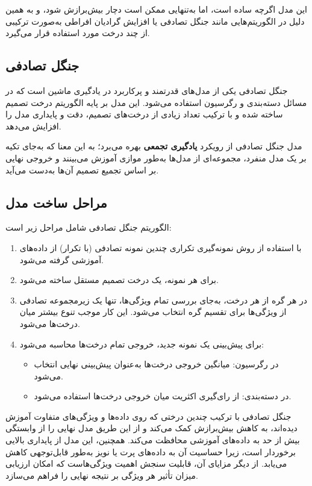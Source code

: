 این مدل اگرچه ساده است، اما به‌تنهایی ممکن است دچار بیش‌برازش شود، و به همین دلیل در الگوریتم‌هایی مانند جنگل تصادفی یا افزایش گرادیان افراطی به‌صورت ترکیبی از چند درخت مورد استفاده قرار می‌گیرد.



\subsection[جنگل تصادفی]{جنگل تصادفی}

جنگل تصادفی یکی از مدل‌های قدرتمند و پرکاربرد در یادگیری ماشین است که در مسائل دسته‌بندی و رگرسیون استفاده می‌شود. این مدل بر پایه الگوریتم درخت تصمیم ساخته شده و با ترکیب تعداد زیادی از درخت‌های تصمیم، دقت و پایداری مدل را افزایش می‌دهد.

مدل جنگل تصادفی از رویکرد \textbf{یادگیری تجمعی} بهره می‌برد؛ به این معنا که به‌جای تکیه بر یک مدل منفرد، مجموعه‌ای از مدل‌ها به‌طور موازی آموزش می‌بینند و خروجی نهایی بر اساس تجمیع تصمیم آن‌ها به‌دست می‌آید.

\subsection*{مراحل ساخت مدل}

الگوریتم جنگل تصادفی شامل مراحل زیر است:

\begin{enumerate}
	\item با استفاده از روش نمونه‌گیری تکراری چندین نمونه تصادفی (با تکرار) از داده‌های آموزشی گرفته می‌شود.
	\item برای هر نمونه، یک درخت تصمیم مستقل ساخته می‌شود.
	\item در هر گره از هر درخت، به‌جای بررسی تمام ویژگی‌ها، تنها یک زیرمجموعه تصادفی از ویژگی‌ها برای تقسیم گره انتخاب می‌شود. این کار موجب تنوع بیشتر میان درخت‌ها می‌شود.
	\item برای پیش‌بینی یک نمونه جدید، خروجی تمام درخت‌ها محاسبه می‌شود:
	\begin{itemize}
		\item در رگرسیون: میانگین خروجی درخت‌ها به‌عنوان پیش‌بینی نهایی انتخاب می‌شود.
		\item در دسته‌بندی: از رای‌گیری اکثریت میان خروجی درخت‌ها استفاده می‌شود.
	\end{itemize}
\end{enumerate}

جنگل تصادفی با ترکیب چندین درختی که روی داده‌ها و ویژگی‌های متفاوت آموزش دیده‌اند، به کاهش بیش‌برازش کمک می‌کند و از این طریق مدل نهایی را از وابستگی بیش از حد به داده‌های آموزشی محافظت می‌کند. همچنین، این مدل از پایداری بالایی برخوردار است، زیرا حساسیت آن به داده‌های پرت یا نویز به‌طور قابل‌توجهی کاهش می‌یابد. از دیگر مزایای آن، قابلیت سنجش اهمیت ویژگی‌هاست که امکان ارزیابی میزان تأثیر هر ویژگی بر نتیجه نهایی را فراهم می‌سازد.

